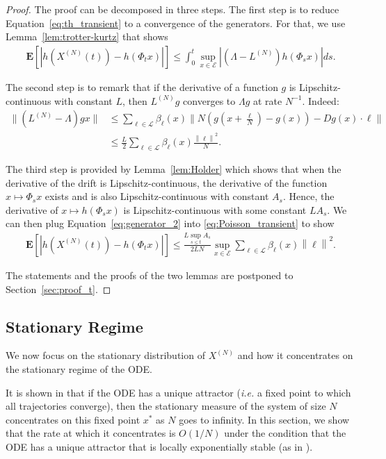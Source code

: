 \documentclass[sigconf]{acmart}
\newcommand\XN{X^{(N)}}
\newcommand\LN{L^{(N)}}
\newcommand\E{\mathcal{E}}
\newcommand\calL{\mathcal{L}}
\newcommand\esp[1]{\mathbf{E}\left[#1\right]}
\newcommand\norm[1]{\left\|#1\right\|}
\newcommand\abs[1]{\left|#1\right|}
\begin{document}
\begin{proof}
  The proof can be decomposed in three steps.  The first step is to
  reduce Equation~\eqref{eq:th_transient} to a convergence of the
  generators. For that, we use Lemma~\ref{lem:trotter-kurtz} that
  shows
  \begin{align}
    \esp{\abs{h(\XN(t))-h(\Phi_tx)}} \le
    \int_0^t\sup_{x\in\E}|(\Lambda-\LN)h(\Phi_sx)|ds.
    \label{eq:Poisson_transient}
  \end{align}
  
  The second step is to remark that if the derivative of a function
  $g$ is Lipschitz-continuous with constant $L$, then $\LN g$
  converges to $\Lambda g$ at rate $N^{-1}$. Indeed:
  \begin{align}
    \bigg\|(\LN\!{-}\Lambda)g x\bigg\|
    &\le \sum_{\ell\in\calL}
      \beta_\ell(x)\bigg\|N(g(x{+}\frac{\ell}{N}){-}g(x)){-}Dg(x)
      \cdot \ell \bigg\|\nonumber\\
    &\le \frac{L}{2}\sum_{\ell\in\calL} \beta_\ell(x)
      \frac{\norm{\ell}^{2}}{{N}}. 
      \label{eq:generator_2}
  \end{align}
  
  The third step is provided by Lemma~\ref{lem:Holder} which shows
  that when the derivative of the drift is Lipschitz-continuous, the
  derivative of the function $x\mapsto \Phi_s x$ exists and is also
  Lipschitz-continuous with constant $A_s$. Hence, the derivative of
  $x\mapsto h(\Phi_sx)$ is Lipschitz-continuous with some constant
  $LA_s$. We can then plug Equation~\eqref{eq:generator_2} into
  \eqref{eq:Poisson_transient} to show
  \begin{align*}
    \esp{\abs{h(\XN(t))-h(\Phi_tx)}} \le \frac{L\sup_{s\le
    t}A_s}{2LN}\sup_{x\in\E}\sum_{\ell\in\calL}\beta_\ell(x)\norm{\ell}^2.  
  \end{align*}
  
  The statements and the proofs of the two lemmas are postponed to
  Section~\ref{sec:proof_t}.
\end{proof}



\subsection{Stationary Regime}
\label{sec:steady}

We now focus on the stationary distribution of $\XN$ and how it
concentrates on the stationary regime of the ODE.

It is shown in \cite{benaim2008class} that if the ODE has a unique
attractor (\emph{i.e.} a fixed point to which all trajectories
converge), then the stationary measure of the system of size $N$
concentrates on this fixed point $x^*$ as $N$ goes to infinity.  In
this section, we show that the rate at which it concentrates is
$O(1/N)$ under the condition that the ODE has a unique attractor that
is locally exponentially stable (as in \cite{ying2016rate}).
\end{document}
